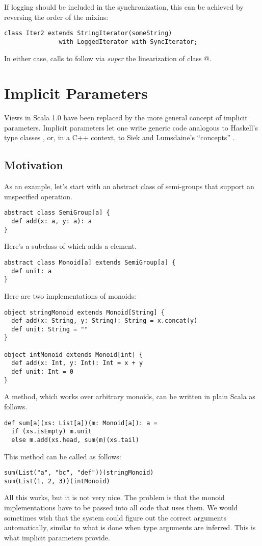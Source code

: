 \documentclass[a4paper,11pt,twoside]{article}
\begin{document}
If logging should be included in the synchronization, this can be
achieved by reversing the order of the mixins:
\begin{lstlisting}
class Iter2 extends StringIterator(someString) 
               with LoggedIterator with SyncIterator;         
\end{lstlisting}
In either case, calls to \lstinline@next@ follow via
{\em super} the linearization of class @.

\section{Implicit Parameters}\label{implicits}

Views in Scala 1.0 have been replaced by the more general concept of
implicit parameters. Implicit parameters let one write generic code
analogous to Haskell's type classes \cite{chen-hudak-odersky:parametric-conf},
or, in a C++ context, to Siek and Lumsdaine's ``concepts'' \cite{siek-lumsdaine:pldi05}.

\subsection*{Motivation}

As an example, let's start with an abstract class of semi-groups that
support an unspecified \lstinline@add@ operation.
\begin{lstlisting}
abstract class SemiGroup[a] {
  def add(x: a, y: a): a
}
\end{lstlisting}
Here's a subclass \lstinline@Monoid@ of \lstinline@SemiGroup@ which adds a
\lstinline@unit@ element.
\begin{lstlisting}
abstract class Monoid[a] extends SemiGroup[a] {
  def unit: a
}
\end{lstlisting}
Here are two implementations of monoids:
\begin{lstlisting}
object stringMonoid extends Monoid[String] {
  def add(x: String, y: String): String = x.concat(y)
  def unit: String = ""
}

object intMonoid extends Monoid[int] {
  def add(x: Int, y: Int): Int = x + y
  def unit: Int = 0
}
\end{lstlisting}
A \lstinline@sum@ method, which works over arbitrary
monoids, can be written in plain Scala as follows.
\begin{lstlisting}
def sum[a](xs: List[a])(m: Monoid[a]): a =
  if (xs.isEmpty) m.unit
  else m.add(xs.head, sum(m)(xs.tail)
\end{lstlisting}
This \lstinline@sum@ method can be called as follows:
\begin{lstlisting}
sum(List("a", "bc", "def"))(stringMonoid)
sum(List(1, 2, 3))(intMonoid)
\end{lstlisting}
All this works, but it is not very nice. The problem is that the
monoid implementations have to be passed into all code that uses them.
We would sometimes wish that the system could figure out the correct
arguments automatically, similar to what is done when type arguments
are inferred. This is what implicit parameters provide.
\end{document}
